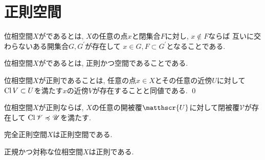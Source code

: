 \documentclass[uplatex, dvipdfmx, a4paper, 12pt, class=jsbook, crop=false]{standalone}
\begin{document}
\section{正則空間}
\label{sec:regular-spaces}

\begin{definition}
	位相空間$ X $がであるとは,
	$ X $の任意の点$ x $と閉集合$ F $に対し,
	$ x \not\in F $ならば
	互いに交わらないある開集合$ G, G^\prime $が存在して
	$ x \in G, F \subset G^\prime $となることである.
\end{definition}

\begin{definition}
	位相空間$ X $がであるとは,
	正則かつ空間であることである.
\end{definition}

\begin{proposition}
	\label{prop:A property equivalent to regularity}
	位相空間$ X $が正則であることは,
	任意の点$ x \in X $とその任意の近傍$ U $に対して
	$ \mathop{\mathrm{Cl}}\nolimits{V} \subset U $を満たす$ x $の近傍$ V $が存在することと同値である.
	\qed
\end{proposition}

\begin{corollary}
	位相空間$ X $が正則ならば,
	$ X $の任意の開被覆$\matthscr{U}$に対して閉被覆$\mathscr{V}$が存在して
	$\mathop{\mathrm{Cl}}\nolimits \mathscr{V} \preccurlyeq \mathscr{U}$を満たす.
\end{corollary}

\begin{proposition}
	完全正則空間$ X $は正則空間である.
\end{proposition}

\begin{proposition}
	正規かつ対称な位相空間$ X $は正則である.
\end{proposition}
\end{document}

